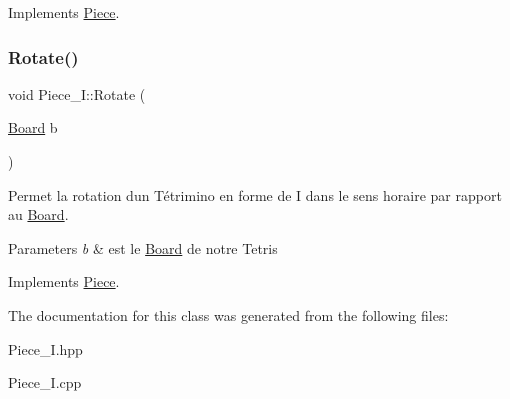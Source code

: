 Implements \hyperlink{classPiece_a56cdf7f4234fe848a3e203b693b7a862}{Piece}.

\mbox{\label{classPiece__I_ab7983a575f6d5d41cbf846b6240a9b43}} 
\subsubsection{\texorpdfstring{Rotate()}{Rotate()}}
{\footnotesize\ttfamily void Piece\+\_\+\+I\+::\+Rotate (\begin{DoxyParamCaption}\item[{\hyperlink{classBoard}{Board}}]{b }\end{DoxyParamCaption})\hspace{0.3cm}{\ttfamily [virtual]}}



Permet la rotation d\textquotesingle{}un Tétrimino en forme de I dans le sens horaire par rapport au \hyperlink{classBoard}{Board}. 


\begin{DoxyParams}{Parameters}
{\em b} & est le \hyperlink{classBoard}{Board} de notre Tetris \\
\hline
\end{DoxyParams}


Implements \hyperlink{classPiece_a078f3cc6281cb8f60af3ae2266c651ba}{Piece}.



The documentation for this class was generated from the following files\+:\begin{DoxyCompactItemize}
\item 
Piece\+\_\+\+I.\+hpp\item 
Piece\+\_\+\+I.\+cpp\end{DoxyCompactItemize}
